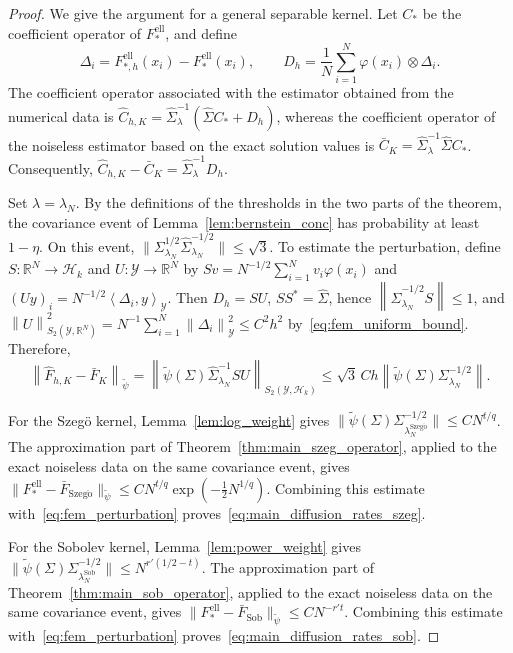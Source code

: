 \documentclass[11pt]{article}
\numberwithin{equation}{section}
\theoremstyle{plain}
\theoremstyle{definition}
\theoremstyle{remark}
\newcommand{\Hs}{\mathcal{H}}
\newcommand{\Y}{\mathcal{Y}}
\newcommand{\norm}[1]{\left\lVert#1\right\rVert}
\newcommand{\innerpro}[1]{\left\langle#1\right\rangle}
\newcommand{\tpsi}{\widetilde{\psi}}
\newcommand{\Fell}{F_{*}^{\mathrm{ell}}}
\begin{document}
\begin{proof}
We give the argument for a general separable kernel. Let $C_*$ be the
coefficient operator of $\Fell$, and define
\[
\Delta_i
=
F_{*,h}^{\mathrm{ell}}(x_i)-\Fell(x_i),
\qquad
D_h
=
\frac1N\sum_{i=1}^N
\varphi(x_i)\otimes\Delta_i.
\]
The coefficient operator associated with the estimator obtained from the
numerical data is
$\hat{C}_{h,K}=\hat{\Sigma}_{\lambda}^{-1}(\hat{\Sigma}C_*+D_h)$,
whereas the coefficient operator of the noiseless estimator based on the
exact solution values is
$\bar{C}_K=\hat{\Sigma}_{\lambda}^{-1}\hat{\Sigma}C_*$.
Consequently,
$\hat{C}_{h,K}-\bar{C}_K=\hat{\Sigma}_{\lambda}^{-1}D_h$.

Set $\lambda=\lambda_N$. By the definitions of the thresholds in the two
parts of the theorem, the covariance event of
Lemma~\ref{lem:bernstein_conc} has probability at least
$1-\eta$. On this event,
$\|\Sigma_{\lambda_N}^{1/2}\hat{\Sigma}_{\lambda_N}^{-1/2}\|\leq \sqrt3$.
To estimate the perturbation, define $S\colon\mathbb{R}^N\to\Hs_k$ and
$U\colon\Y\to\mathbb{R}^N$ by
$Sv=N^{-1/2}\sum_{i=1}^Nv_i\varphi(x_i)$ and
$(Uy)_i=N^{-1/2}\innerpro{\Delta_i,y}_{\Y}$. Then $D_h=SU$, $SS^*=\hat\Sigma$,
hence $\norm{\hat\Sigma_{\lambda_N}^{-1/2}S}\leq1$, and
$\norm{U}_{S_2(\Y,\mathbb{R}^N)}^2=N^{-1}\sum_{i=1}^N\norm{\Delta_i}_{\Y}^2\leq C^2h^2$
by~\eqref{eq:fem_uniform_bound}. Therefore,
\begin{equation}
\left\|\hat{F}_{h,K}-\bar{F}_K\right\|_{\tpsi}
=
\left\|\tpsi(\Sigma)\hat\Sigma_{\lambda_N}^{-1}SU\right\|_{S_2(\Y,\Hs_k)}
\leq
\sqrt3\,Ch
\left\|\tpsi(\Sigma)
\Sigma_{\lambda_N}^{-1/2}\right\|.
\label{eq:fem_perturbation}
\end{equation}

For the Szegö kernel, Lemma~\ref{lem:log_weight} gives
$\|\tpsi(\Sigma)\Sigma_{\lambda_N^{\mathrm{Szeg\ddot{o}}}}^{-1/2}\|\leq CN^{t/q}$.
The approximation part of Theorem~\ref{thm:main_szeg_operator}, applied to the
exact noiseless data on the same covariance event, gives
$\|\Fell-\bar{F}_{\mathrm{Szeg\ddot{o}}}\|_{\tpsi}\leq CN^{t/q}\exp(-\frac12N^{1/q})$.
Combining this estimate with~\eqref{eq:fem_perturbation} proves~\eqref{eq:main_diffusion_rates_szeg}.

For the Sobolev kernel, Lemma~\ref{lem:power_weight} gives
$\|\tpsi(\Sigma)\Sigma_{\lambda_N^{\mathrm{Sob}}}^{-1/2}\|\leq N^{r'(1/2-t)}$.
The approximation part of Theorem~\ref{thm:main_sob_operator}, applied to the
exact noiseless data on the same covariance event, gives
$\|\Fell-\bar{F}_{\mathrm{Sob}}\|_{\tpsi}\leq CN^{-r't}$.
Combining this estimate with~\eqref{eq:fem_perturbation} proves~\eqref{eq:main_diffusion_rates_sob}.
\end{proof}
\end{document}
